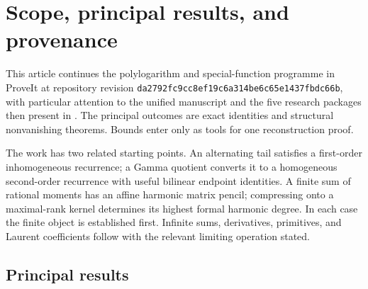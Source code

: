 \documentclass[11pt]{article}
\theoremstyle{definition}
\theoremstyle{remark}
\numberwithin{equation}{section}
\begin{document}
\tableofcontents
\clearpage
\section{Scope, principal results, and provenance}
\label{scope:sec}

This article continues the polylogarithm and special-function programme
in ProveIt at repository revision
\texttt{da2792fc9cc8ef19c6a314be6c65e1437fbdc66b}, with particular attention
to the unified manuscript and the five research packages then present
in . The principal outcomes are exact identities
and structural nonvanishing theorems. Bounds enter only as tools for
one reconstruction proof.

The work has two related starting points. An alternating tail satisfies
a first-order inhomogeneous recurrence; a Gamma quotient converts it
to a homogeneous second-order recurrence with useful bilinear endpoint
identities. A finite sum of rational moments has an affine harmonic
matrix pencil; compressing onto a maximal-rank kernel determines its
highest formal harmonic degree. In each case the finite object is
established first. Infinite sums, derivatives, primitives, and Laurent
coefficients follow with the relevant limiting operation stated.

\subsection{Principal results}
\end{document}
